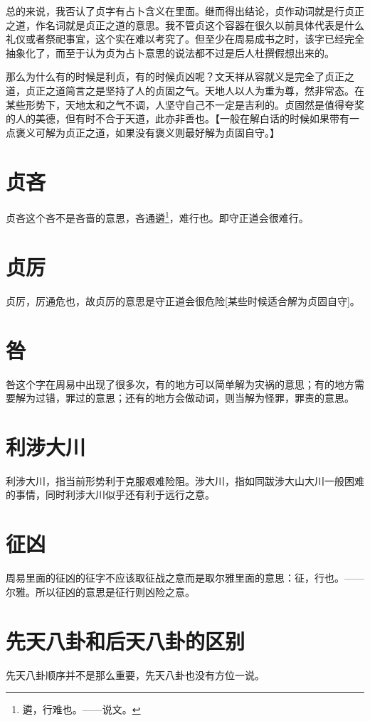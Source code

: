 \documentclass[12pt,oneside]{book}
\begin{document}
总的来说，我否认了贞字有占卜含义在里面。继而得出结论，贞作动词就是行贞正之道，作名词就是贞正之道的意思。我不管贞这个容器在很久以前具体代表是什么礼仪或者祭祀事宜，这个实在难以考究了。但至少在周易成书之时，该字已经完全抽象化了，而至于认为贞为占卜意思的说法都不过是后人杜撰假想出来的。

那么为什么有的时候是利贞，有的时候贞凶呢？文天祥从容就义是完全了贞正之道，贞正之道简言之是坚持了人的贞固之气。天地人以人为重为尊，然非常态。在某些形势下，天地太和之气不调，人坚守自己不一定是吉利的。贞固然是值得夸奖的人的美德，但有时不合于天道，此亦非善也。【一般在解白话的时候如果带有一点褒义可解为贞正之道，如果没有褒义则最好解为贞固自守。】


\section{贞吝}
贞吝这个吝不是吝啬的意思，吝通遴\footnote{遴，行难也。——说文。}，难行也。即守正道会很难行。

\section{贞厉}
贞厉，厉通危也，故贞厉的意思是守正道会很危险[某些时候适合解为贞固自守]。

\section{咎}
咎这个字在周易中出现了很多次，有的地方可以简单解为灾祸的意思；有的地方需要解为过错，罪过的意思；还有的地方会做动词，则当解为怪罪，罪责的意思。

\section{利涉大川}
利涉大川，指当前形势利于克服艰难险阻。涉大川，指如同跋涉大山大川一般困难的事情，同时利涉大川似乎还有利于远行之意。

\section{征凶}
周易里面的征凶的征字不应该取征战之意而是取尔雅里面的意思：征，行也。——尔雅。所以征凶的意思是征行则凶险之意。

\section{先天八卦和后天八卦的区别}
先天八卦顺序并不是那么重要，先天八卦也没有方位一说。
\end{document}

